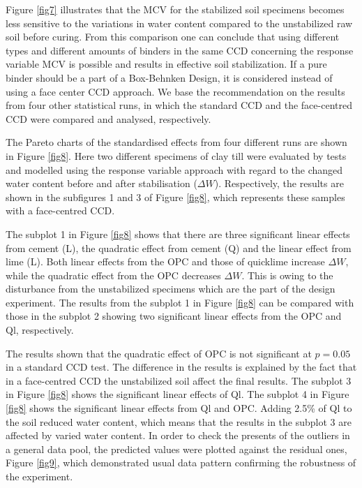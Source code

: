 \documentclass[eprint,
]{actapoly}
\begin{document}
Figure \ref{fig7} illustrates that the MCV for the stabilized soil specimens becomes less sensitive to the variations in water content compared to the unstabilized raw soil before curing. From this comparison one can conclude that using different types and different amounts of binders in the same CCD concerning the response variable MCV is possible and results in effective soil stabilization. If a pure binder should be a part of a Box-Behnken Design, it is considered instead of using a face center CCD approach. We base the recommendation on the results from four other statistical runs, in which the standard CCD and the face-centred CCD were compared and analysed, respectively. 

The Pareto charts of the standardised effects from four different runs are shown in Figure \ref{fig8}. Here two different specimens of clay till were evaluated by tests and modelled using the response variable approach with regard to the changed water content before and after stabilisation ($\Delta W$). Respectively, the results are shown in the subfigures 1 and 3 of Figure \ref{fig8}, which represents these samples with a face-centred CCD. 

The subplot 1 in Figure \ref{fig8} shows that there are three significant linear effects from cement (L), the quadratic effect from cement (Q) and the linear effect from lime (L). Both linear effects from the OPC and those of quicklime increase $\Delta W$, while the quadratic effect from the OPC decreases $\Delta W$. This is owing to the disturbance from the unstabilized specimens which are the part of the design experiment. The results from the subplot 1 in Figure \ref{fig8} can be compared with those in the subplot 2 showing two significant linear effects from the OPC and Ql, respectively. 

The results shown that the quadratic effect of OPC is not significant at $p=0.05$ in a standard CCD test. The difference in the results is explained by the fact that in a face-centred CCD the unstabilized soil affect the final results. The subplot 3 in Figure \ref{fig8} shows the significant linear effects of Ql. The subplot 4 in Figure \ref{fig8} shows the significant linear effects from Ql and OPC. Adding 2.5\% of Ql to the soil reduced water content, which means that the results in the subplot 3 are affected by varied water content. In order to check the presents of the outliers in a general data pool, the predicted values were plotted against the residual ones, Figure \ref{fig9}, which demonstrated usual data pattern confirming the robustness of the experiment. 
\end{document}
